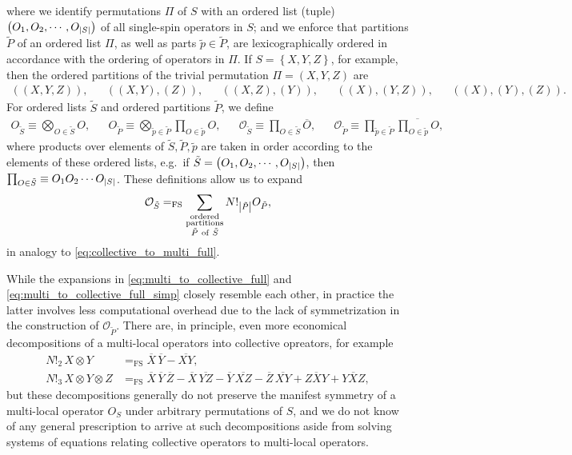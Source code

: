 \documentclass[nofootinbib,notitlepage,11pt]{revtex4-2}
\renewcommand{\t}{\text} %
\newcommand{\p}[1]{\left(#1\right)} %
\renewcommand{\set}[1]{\left\{#1\right\}} %
\newcommand{\1}{\mathds{1}}
\renewcommand{\O}{\mathcal{O}}
\newcommand{\EQFS}{=_{\text{FS}}}
\newcommand{\col}{\overline}
\begin{document}
where we identify permutations $\Pi$ of $S$ with an ordered list
(tuple) $\p{O_1,O_2,\cdots,O_{\abs{S}}}$ of all single-spin operators
in $S$; and we enforce that partitions $\tilde P$ of an ordered list
$\Pi$, as well as parts $\tilde p\in\tilde P$, are lexicographically
ordered in accordance with the ordering of operators in $\Pi$.  If
$S=\set{X,Y,Z}$, for example, then the ordered partitions of the
trivial permutation $\Pi=\p{X,Y,Z}$ are
\begin{align}
  \p{\p{X,Y,Z}}, &&
  \p{\p{X,Y},\p{Z}}, &&
  \p{\p{X,Z},\p{Y}}, &&
  \p{\p{X},\p{Y,Z}}, &&
  \p{\p{X},\p{Y},\p{Z}}.
\end{align}
For ordered lists $\tilde S$ and ordered partitions $\tilde P$, we
define
\begin{align}
  O_{\tilde S} \equiv \bigotimes_{O\in\tilde S} O,
  &&
  O_{\tilde P}
  \equiv \bigotimes_{\tilde p\in\tilde P} \prod_{O\in\tilde p} O,
  &&
  \O_{\tilde S} \equiv \prod_{O\in\tilde S} \col{O},
  &&
  \O_{\tilde P}
  \equiv \prod_{\tilde p\in\tilde P}
  \col{\textstyle\prod_{O\in\tilde p} O},
\end{align}
where products over elements of $\tilde S,\tilde P,\tilde p$ are taken
in order according to the elements of these ordered lists, e.g.~if
$\tilde S=\p{O_1,O_2,\cdots,O_{\abs{S}}}$, then
$\prod_{O\in\tilde S}\equiv O_1O_2\cdots O_{\abs{S}}$.  These
definitions allow us to expand
\begin{align}
  \O_{\tilde S} \EQFS
  \sum_{\substack{\t{ordered}\\\t{partitions}\\\tilde P~\t{of}~\tilde S}}
  N!_{\abs{\tilde P}} O_{\tilde P},
\end{align}
in analogy to \eqref{eq:collective_to_multi_full}.

While the expansions in \eqref{eq:multi_to_collective_full} and
\eqref{eq:multi_to_collective_full_simp} closely resemble each other,
in practice the latter involves less computational overhead due to the
lack of symmetrization in the construction of $\O_{\tilde P}$.  There
are, in principle, even more economical decompositions of a
multi-local operators into collective opreators, for example
\begin{align}
  N!_2\, X\otimes Y
  &\EQFS \col{X}\,\col{Y} - \col{XY}, \\
  N!_3\, X\otimes Y \otimes Z
  &\EQFS \col{X}\,\col{Y}\,\col{Z}
  - \col{X}\,\col{YZ} - \col{Y}\,\col{XZ} - \col{Z}\,\col{XY}
  + \col{ZXY} + \col{YXZ},
\end{align}
but these decompositions generally do not preserve the manifest
symmetry of a multi-local operator $O_S$ under arbitrary permutations
of $S$, and we do not know of any general prescription to arrive at
such decompositions aside from solving systems of equations relating
collective operators to multi-local operators.
\end{document}
